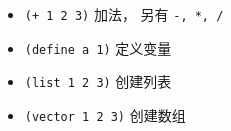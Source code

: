 
\begin{itemize}
\item \verb`(+ 1 2 3)` 加法， 另有 \verb`-, *, /`
\item \verb`(define a 1)` 定义变量
\item \verb`(list 1 2 3)` 创建列表
\item \verb`(vector 1 2 3)` 创建数组
\end{itemize}

